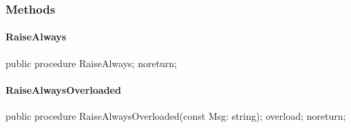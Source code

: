 \documentclass{report}
\newif\ifpdf
\begin{document}
\subsubsection*{\large{\textbf{Methods}}\normalsize\hspace{1ex}\hfill}
\paragraph*{RaiseAlways}\hspace*{\fill}

\label{ok_noreturn.TMyClass-RaiseAlways}
\begin{list}{}{
\setlength{\itemindent}{0cm}
\setlength{\listparindent}{0cm}
\setlength{\leftmargin}{\evensidemargin}
\addtolength{\leftmargin}{\tmplength}
\settowidth{\labelsep}{X}
\addtolength{\leftmargin}{\labelsep}
\setlength{\labelwidth}{\tmplength}
}
\item[\textbf{Declaration}\hfill]
\ifpdf
\begin{flushleft}
\fi
\begin{ttfamily}
public procedure RaiseAlways; noreturn;\end{ttfamily}

\ifpdf
\end{flushleft}
\fi

\end{list}
\paragraph*{RaiseAlwaysOverloaded}\hspace*{\fill}

\label{ok_noreturn.TMyClass-RaiseAlwaysOverloaded}
\begin{list}{}{
\setlength{\itemindent}{0cm}
\setlength{\listparindent}{0cm}
\setlength{\leftmargin}{\evensidemargin}
\addtolength{\leftmargin}{\tmplength}
\settowidth{\labelsep}{X}
\addtolength{\leftmargin}{\labelsep}
\setlength{\labelwidth}{\tmplength}
}
\item[\textbf{Declaration}\hfill]
\ifpdf
\begin{flushleft}
\fi
\begin{ttfamily}
public procedure RaiseAlwaysOverloaded(const Msg: string); overload; noreturn;\end{ttfamily}

\ifpdf
\end{flushleft}
\fi

\end{list}
\end{document}
